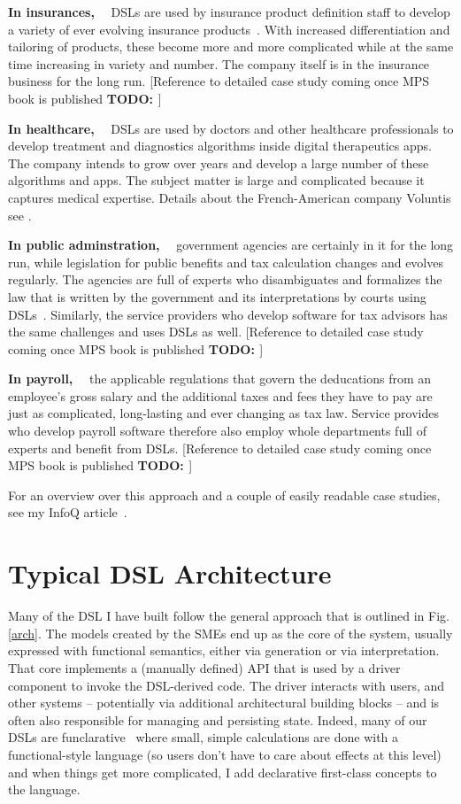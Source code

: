 \documentclass[runningheads]{llncs}
\newcommand\parhead[1]{\vspace{1mm}\noindent\textbf{{#1}}\ \ }
\newcommand{\fig}[1]{Fig. \ref{#1}}  %
\newcommand\todo[1]{\vspace{1mm}\noindent\textbf{\color{red} {{TODO: {#1}} }}}
\begin{document}
\parhead{In insurances,} DSLs are used by insurance product definition staff to develop a
variety of ever evolving insurance products~\cite{zurich}. With increased differentiation and
tailoring of products, these become more and more complicated while at the same time
increasing in variety and number. The company itself is in the insurance business for the
long run. [Reference to detailed case study coming once MPS book is published\todo{}]

\parhead{In healthcare,} DSLs are used by doctors and other healthcare
professionals to develop treatment and diagnostics algorithms inside digital
therapeutics apps. The company intends to grow over years and develop a large
number of these algorithms and apps. The subject matter is large and complicated
because it captures medical expertise. Details about the French-American company
Voluntis see \cite{voelter2019vol}.

\parhead{In public adminstration,} government agencies are certainly in it for
the long run, while legislation for public benefits and tax calculation changes
and evolves regularly. The agencies are full of experts who disambiguates and
formalizes the law that is written by the government and its interpretations by
courts using DSLs~\cite{dta}. Similarly, the service providers who
develop software for tax advisors has the same challenges and uses DSLs as well.
[Reference to detailed case study coming once MPS book is published\todo{}]

\parhead{In payroll,} the applicable regulations that govern the  
deducations from an employee's gross salary and the additional taxes and fees
they have to pay are just as complicated, long-lasting and ever changing as tax
law. Service provides who develop payroll software therefore also employ whole 
departments full of experts and benefit from DSLs. 
[Reference to detailed case study coming once MPS book is published\todo{}]

\vspace{3mm}

\noindent For an overview over this approach and a couple of easily readable 
case studies, see my InfoQ article~\cite{infoq}.


\section{Typical DSL Architecture}
\label{langarch}


Many of the DSL I have built follow the general approach that is outlined in
\fig{arch}. The models created by the SMEs end up as the core of the system,
usually expressed with functional semantics, either via generation or via
interpretation. That core implements a (manually defined) API that is used by a
driver component to invoke the DSL-derived code. The driver interacts with
users, and other systems -- potentially via additional architectural building
blocks -- and is often also responsible for managing and persisting state.
Indeed, many of our DSLs are funclarative~\cite{voelter2018fusing} where small,
simple calculations are done with a functional-style language (so users don't
have to care about effects at this level) and when things get more complicated,
I add declarative first-class concepts to the language.
\end{document}
